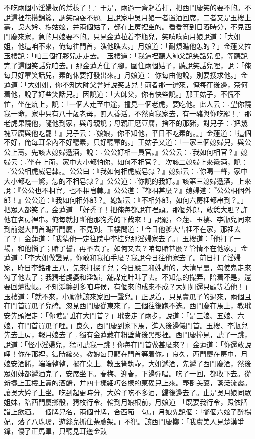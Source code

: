 不吃兩個小淫婦捩的恁樣了！』于是，兩過一齊趕着打，把西門慶笑的要不的。不說這裡花攢錦簇，調笑頑耍不題。且說家中吳月娘一者置酒回席，二者又是玉樓上壽，吳大妗、楊姑娘，并兩個姑子，都在上房裡坐的。看看等到日落時分，不見西門慶來家，急的月娘要不的。只見金蓮拉着李瓶兒，笑嘻嘻向月娘說道：「大姐姐，他這咱不來，俺每往門首，瞧他瞧去。」月娘道：「耐煩瞧他怎的？」金蓮又拉玉樓說：「咱三個打夥兒走走去。」玉樓道：「我這裡聽大師父說笑話兒哩，等聽說完了這個笑話兒咱去。」那金蓮方住了腳，圍住兩個姑子，聽說笑話兒哩，說：「俺每只好葷笑話兒，素的休要打發出來。」月娘道：「你每由他說，別要搜求他。」金蓮道：「大姐姐，你不知大師父會好說笑話兒！前者那一遭來，俺每在後邊，奈何着他，說了好些笑話兒。」因說道：「大師父，你有快些說。」那王姑子，不慌不忙，坐在炕上，說：「一個人走至中途，撞見一個老虎，要吃他。此人云：『望你饒我一命，家中只有八十歲老母，無人養活。不然向我家去，有一豬與你吃罷！』那老虎果饒他，隨他到家，與母親說；母親正磨豆腐，捨不的那豬，對兒子：『把幾塊豆腐與他吃罷！』兒子云：『娘娘，你不知他，平日不吃素的。』」金蓮道：「這個不好，俺每耳朵內不好聽素，只好聽葷的。」王姑子又道：「一家三個媳婦兒，與公公上壽。先該大媳婦遞酒，說：『公公好相一員官。』公公云：『我如何相官？』媳婦云：『坐在上面，家中大小都怕你，如何不相官？』次該二媳婦上來遞酒，說：『公公相虎威皂隸。』公公曰：『我如何相虎威皂隸？』媳婦云：『你喝一聲，家中大小都吃一驚，怎的不相皂隸？』公公道：『你說的我好。』該第三媳婦遞酒，上來說：『公公也不相官，也不相皂隸。』公公道：『都相甚麼？』媳婦道：『公公相個外郎！』公公道：『我如何相外郎？』媳婦云：『不相外郎，如何六房裡都串到？』」把眾人都笑了。金蓮道：「好禿子！把俺每都說在裡頭。那個外郎，敢恁大胆？許他在各房裡串。俺每就打斷他那狗禿的下截來！」說罷，金蓮、玉樓、李瓶兒同來到前邊大門首瞧西門慶，不見到。玉樓問道：「今日他爹大雪裡不在家，那裡去了？」金蓮道：「我猜他一定往院中李桂兒那淫婦家去了。」玉樓道：「他打了一場，和他惱了；賭了誓，再不去了。如何又去？咱每賭甚麼？管情不在他家。」金蓮道：「李大姐做證見，你敢和我拍手麼？我說今日往他家去了。前日打了淫婦家，昨日李銘那王八，先來打探子兒；今日應二和姓謝的，大清早晨，勾使鬼走來勾了他去了；我猜老虔婆和淫婦，舖謀定計叫了去。不知怎的撮弄，陪着不是，還要回爐復帳。不知涎纏到多咱時候，有個來的成來不成？大姐姐還只顧等着他！」玉樓道：「就不來，小廝他該來家回一聲兒。」正說着，只見賣瓜子的過來，兩個且在門首買瓜子兒磕。忽見西門慶從東來了，三個往後跑不迭。西門慶在馬上，教玳安先頭裡走：「你瞧是誰在大門首？」玳安走了兩步，說道：「是三娘、五娘、六娘，在門首買瓜子哩。」良久，西門慶到家下馬，進入後邊儀門首。玉樓、李瓶兒先去上房，報月娘去了；獨有金蓮藏在粉壁背後黑影裡。西門慶撞見，諕了一跳，說道：「怪小淫婦兒，猛可諕我一跳！你每在門首做甚麼來？」金蓮道：「你還敢說哩！你在那裡，這時纔來，教娘每只顧在門首等着你。」良久，西門慶在房中，月娘安酒餚，端端整整，擺在桌上。教玉筲執壺，大姐遞酒，先遞了西門慶酒，然後眾姐妹都遞酒完了，安席坐下。春梅、迎春，下邊彈唱。吃了一回，都收下去。從新擺上玉樓上壽的酒餚，并四十樣細巧各樣的菓碟兒上來。壺斟美釀，盞泛流霞。讓吳大妗子上坐。吃到起更時分，大妗子吃不多酒，歸後邊去了。止是吳月娘同眾姐妹，陪西門慶擲骰，猜枚行令。輪到月娘根前，月娘道：「既要我行令，照依牌譜上飲酒。一個牌兒名，兩個骨牌，合西廂一句。」月娘先說個：「擲個六娘子醉楊妃，落了八珠環，遊絲兒抓住荼蘪架。」不犯。該西門慶擲：「我虞美人見楚漢爭鋒，傷了正馬軍，只聽見耳邊金鼓